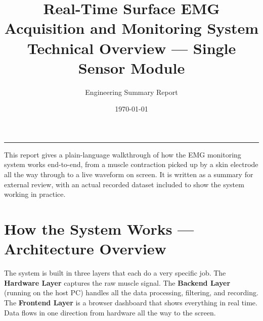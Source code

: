 \documentclass[11pt,a4paper]{article}
\title{
  \vspace{-1.5cm}
  {\bfseries\Large\color{primary} Real-Time Surface EMG Acquisition and Monitoring System}\\[6pt]
  {\normalsize\color{darkgray} Technical Overview --- Single Sensor Module}
}
\author{\color{darkgray} Engineering Summary Report}
\date{\today}
\begin{document}
\maketitle
\vspace{-0.5cm}
\noindent\rule{\textwidth}{0.6pt}
\vspace{0.3cm}

\noindent
This report gives a plain-language walkthrough of how the EMG monitoring system works end-to-end, from a muscle contraction picked up by a skin electrode all the way through to a live waveform on screen. It is written as a summary for external review, with an actual recorded dataset included to show the system working in practice.

\section{How the System Works --- Architecture Overview}

The system is built in three layers that each do a very specific job. The \textbf{Hardware Layer} captures the raw muscle signal. The \textbf{Backend Layer} (running on the host PC) handles all the data processing, filtering, and recording. The \textbf{Frontend Layer} is a browser dashboard that shows everything in real time. Data flows in one direction from hardware all the way to the screen.
\end{document}
